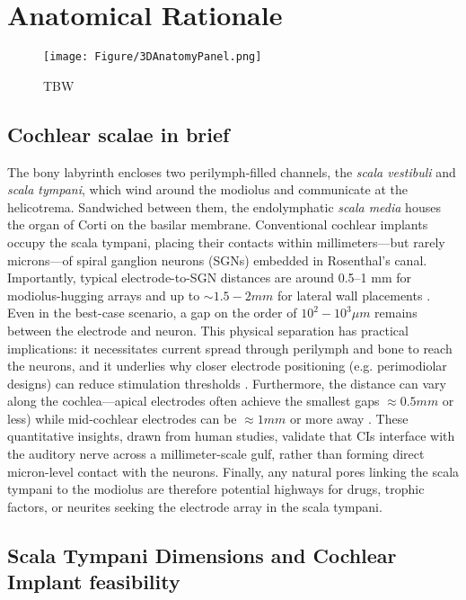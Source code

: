 \section{\label{sec:AnatRationale}Anatomical Rationale}


\begin{figure}[ht]
  \centering
  \texttt{[image: Figure/3DAnatomyPanel.png]}
  \caption{TBW}
  \label{fig:cochlea_overview}
\end{figure}
\subsection{Cochlear scalae in brief}  
The bony labyrinth encloses two perilymph‑filled channels, the \emph{scala vestibuli} and \emph{scala tympani}, which wind around the modiolus and communicate at the helicotrema. Sandwiched between them, the endolymphatic \emph{scala media} houses the organ of Corti on the basilar membrane.  Conventional cochlear implants occupy the scala tympani, placing their contacts within millimeters---but rarely microns---of spiral ganglion neurons (SGNs) embedded in Rosenthal’s canal. Importantly, typical electrode-to-SGN distances are around 0.5–1 mm for modiolus-hugging arrays and up to $\sim1.5-2 mm$ for lateral wall placements \cite{Davis2016}. Even in the best-case scenario, a gap on the order of $10^{2}-10^{3} \mu m$ remains between the electrode and neuron. This physical separation has practical implications: it necessitates current spread through perilymph and bone to reach the neurons, and it underlies why closer electrode positioning (e.g. perimodiolar designs) can reduce stimulation thresholds \cite{Kawano1998}. Furthermore, the distance can vary along the cochlea---apical electrodes often achieve the smallest gaps $\approx0.5 mm$ or less) while mid-cochlear electrodes can be $\approx1 mm$ or more away \cite{Long2014}. These quantitative insights, drawn from human studies, validate that CIs interface with the auditory nerve across a millimeter-scale gulf, rather than forming direct micron-level contact with the neurons. Finally, any natural pores linking the scala tympani to the modiolus are therefore potential highways for drugs, trophic factors, or neurites seeking the electrode array in the scala tympani.


\subsection{Scala Tympani Dimensions and Cochlear Implant feasibility}
